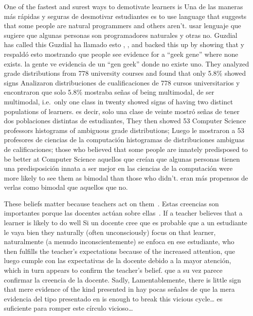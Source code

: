 One of the fastest and surest ways to demotivate learners is
Una de las maneras más rápidas y seguras de desmotivar estudiantes es
to use language that suggests that some people are natural programmers and others aren't.
usar lenguaje que sugiere que algunas personas son programadores naturales y otras no.
Guzdial has called this
Guzdial ha llamado esto
,
,
and \cite{Pati2016} backed this up by showing that
y \cite{Pati2016} respaldó esto mostrando que
people see evidence for a ``geek gene'' where none exists.
la gente ve evidencia de un ``gen geek” donde no existe uno.
They analyzed grade distributions from 778 university courses and found that only 5.8\% showed signs
Analizaron distribuciones de cualificaciones de 778 cursos universitarios y encontraron que solo 5.8\% mostraba señas
of being multimodal,
de ser multimodal,
i.e.\ only one class in twenty showed signs of having two distinct populations of learners.
es decir, solo una clase de veinte mostró señas de tener dos poblaciones distintas de estudiantes,
They then showed 53 Computer Science professors histograms of ambiguous grade distributions;
Luego le mostraron a 53 profesores de ciencias de la computación histogramas de distribuciones ambiguas de calificaciones;
those who believed that some people are innately predisposed to be better at Computer Science
aquellos que creían que algunas personas tienen una predisposición innata a ser mejor en las ciencias de la computación
were more likely to see them as bimodal than those who didn't.
eran más propensos de verlas como bimodal que aquellos que no.

These beliefs matter because teachers act on them~\cite{Brop1983}.
Estas creencias son importantes porque las docentes actúan sobre ellas~\cite{Brop1983}.
If a teacher believes that a learner is likely to do well
Si un docente cree que es probable que a un estudiante le vaya bien
they naturally (often unconsciously) focus on that learner,
naturalmente (a menudo inconscientemente) se enfoca en ese estudiante,
who then fulfills the teacher's expectations because of the increased attention,
que luego cumple con las expectativas de la docente debido a la mayor atención,
which in turn appears to confirm the teacher's belief.
que a su vez parece confirmar la creencia de la docente.
Sadly,
Lamentablemente,
there is little sign that mere evidence of the kind presented in \cite{Pati2016}
hay pocas señales de que la mera evidencia del tipo presentado en \cite{Pati2016}
is enough to break this vicious cycle{\ldots}
es suficiente para romper este círculo vicioso{\ldots}

